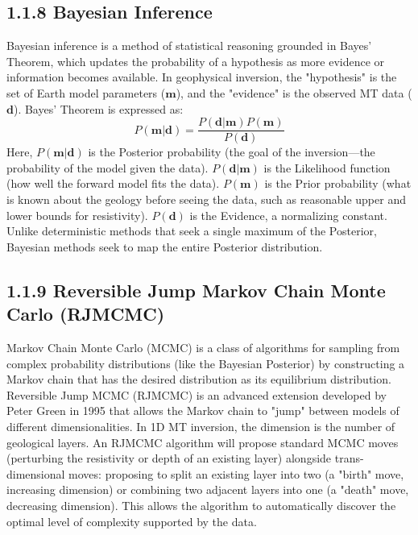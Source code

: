 \subsection{1.1.8 Bayesian Inference}
Bayesian inference is a method of statistical reasoning grounded in Bayes' Theorem, which updates the probability of a hypothesis as more evidence or information becomes available. In geophysical inversion, the "hypothesis" is the set of Earth model parameters ($\mathbf{m}$), and the "evidence" is the observed MT data ($\mathbf{d}$). Bayes' Theorem is expressed as:
\begin{equation}
P(\mathbf{m}|\mathbf{d}) = \frac{P(\mathbf{d}|\mathbf{m}) P(\mathbf{m})}{P(\mathbf{d})}
\end{equation}
Here, $P(\mathbf{m}|\mathbf{d})$ is the Posterior probability (the goal of the inversion—the probability of the model given the data). $P(\mathbf{d}|\mathbf{m})$ is the Likelihood function (how well the forward model fits the data). $P(\mathbf{m})$ is the Prior probability (what is known about the geology before seeing the data, such as reasonable upper and lower bounds for resistivity). $P(\mathbf{d})$ is the Evidence, a normalizing constant. Unlike deterministic methods that seek a single maximum of the Posterior, Bayesian methods seek to map the entire Posterior distribution.

\subsection{1.1.9 Reversible Jump Markov Chain Monte Carlo (RJMCMC)}
Markov Chain Monte Carlo (MCMC) is a class of algorithms for sampling from complex probability distributions (like the Bayesian Posterior) by constructing a Markov chain that has the desired distribution as its equilibrium distribution. Reversible Jump MCMC (RJMCMC) is an advanced extension developed by Peter Green in 1995 that allows the Markov chain to "jump" between models of different dimensionalities. In 1D MT inversion, the dimension is the number of geological layers. An RJMCMC algorithm will propose standard MCMC moves (perturbing the resistivity or depth of an existing layer) alongside trans-dimensional moves: proposing to split an existing layer into two (a "birth" move, increasing dimension) or combining two adjacent layers into one (a "death" move, decreasing dimension). This allows the algorithm to automatically discover the optimal level of complexity supported by the data.

